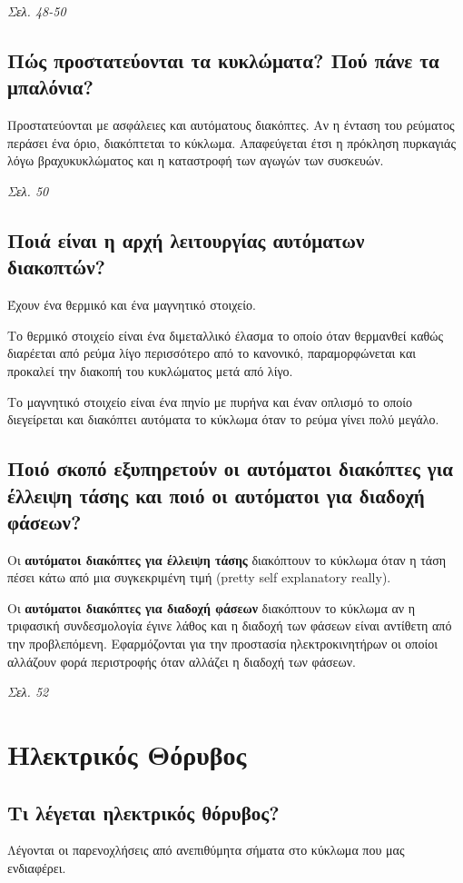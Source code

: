 \documentclass{article}
\begin{document}
\emph{Σελ. 48-50}

\subsection{Πώς προστατεύονται τα κυκλώματα? Πού πάνε τα μπαλόνια?}
Προστατεύονται με ασφάλειες και αυτόματους διακόπτες. Αν η ένταση του ρεύματος περάσει ένα όριο, διακόπτεται το κύκλωμα. Απαφεύγεται έτσι η πρόκληση πυρκαγιάς λόγω 
βραχυκυκλώματος και η καταστροφή των αγωγών των συσκευών.

\emph{Σελ. 50}
\subsection{Ποιά είναι η αρχή λειτουργίας αυτόματων διακοπτών?}
Έχουν ένα θερμικό και ένα μαγνητικό στοιχείο. 

Το θερμικό στοιχείο είναι ένα διμεταλλικό έλασμα το οποίο όταν θερμανθεί καθώς διαρέεται από ρεύμα λίγο περισσότερο από το κανονικό, παραμορφώνεται και προκαλεί
την διακοπή του κυκλώματος μετά από λίγο. 

Το μαγνητικό στοιχείο είναι ένα πηνίο με πυρήνα και έναν οπλισμό το οποίο διεγείρεται και διακόπτει αυτόματα το κύκλωμα όταν το ρεύμα γίνει πολύ μεγάλο.

\subsection{Ποιό σκοπό εξυπηρετούν οι αυτόματοι διακόπτες για έλλειψη τάσης και ποιό οι αυτόματοι για διαδοχή φάσεων?}

Οι \textbf{αυτόματοι διακόπτες για έλλειψη τάσης} διακόπτουν το κύκλωμα όταν η τάση πέσει κάτω από μια συγκεκριμένη τιμή 
(\foreignlanguage{english}{pretty self explanatory really}). 

Οι \textbf{αυτόματοι διακόπτες για διαδοχή φάσεων} διακόπτουν το κύκλωμα αν η τριφασική συνδεσμολογία έγινε λάθος και η διαδοχή των φάσεων είναι αντίθετη από την 
προβλεπόμενη. Εφαρμόζονται για την προστασία ηλεκτροκινητήρων οι οποίοι αλλάζουν φορά περιστροφής όταν αλλάζει η διαδοχή των φάσεων.

\emph{Σελ. 52}

\section{Ηλεκτρικός Θόρυβος}
\subsection{Τι λέγεται ηλεκτρικός θόρυβος?}
Λέγονται οι παρενοχλήσεις από ανεπιθύμητα σήματα στο κύκλωμα που μας ενδιαφέρει.
\end{document}
